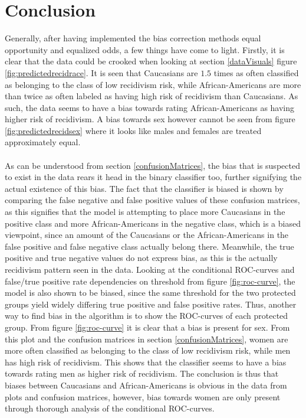\documentclass[11pt, fleqn, titlepage]{article}
\begin{document}
	\section{Conclusion} \label{conclusion}
	Generally, after having implemented the bias correction methods equal opportunity and equalized odds, a few things have come to light. Firstly, it is clear that the data could be crooked when looking at section \ref{dataVisuals} figure \ref{fig:predictedrecidrace}. It is seen that Caucasians are $ 1.5 $ times as often classified as belonging to the class of low recidivism risk, while African-Americans are more than twice as often labeled as having high risk of recidivism than Caucasians. As such, the data seems to have a bias towards rating African-Americans as having higher risk of recidivism. A bias towards sex however cannot be seen from figure \ref{fig:predictedrecidsex} where it looks like males and females are treated approximately equal. 
	\\\\
	As can be understood from section \ref{confusionMatrices}, the bias that is suspected to exist in the data rears it head in the binary classifier too, further signifying the actual existence of this bias. The fact that the classifier is biased is shown by comparing the false negative and false positive values of these confusion matrices, as this signifies that the model is attempting to place more Caucasians in the positive class and more African-Americans in the negative class, which is a biased viewpoint, since an amount of the Caucasians or the African-Americans in the false positive and false negative class actually belong there. Meanwhile, the true positive and true negative values do not express bias, as this is the actually recidivism pattern seen in the data. Looking at the conditional ROC-curves and false/true positive rate dependencies on threshold from figure \ref{fig:roc-curve}, the model is also shown to be biased, since the same threshold for the two protected groups yield widely differing true positive and false positive rates. Thus, another way to find bias in the algorithm is to show the ROC-curves of each protected group. From figure \ref{fig:roc-curve} it is clear that a bias is present for sex. From this plot and the confusion matrices in section \ref{confusionMatrices}, women are more often classified as belonging to the class of low recidivism risk, while men has high risk of recidivism. This shows that the classifier seems to have a bias towards rating men as higher risk of recidivism. The conclusion is thus that biases between Caucasians and African-Americans is obvious in the data from plots and confusion matrices, however, bias towards women are only present through thorough analysis of the conditional ROC-curves.
\end{document}
